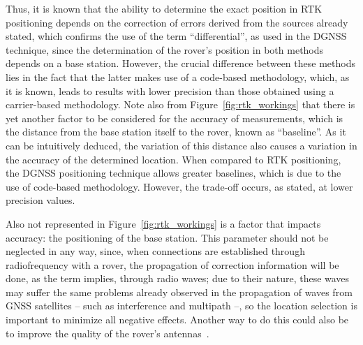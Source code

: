Thus, it is known that the ability to determine the exact position in RTK positioning depends on the correction of errors derived from the sources already stated, which confirms the use of the term ``differential'', as used in the DGNSS technique, since the determination of the rover's position in both methods depends on a base station. However, the crucial difference between these methods lies in the fact that the latter makes use of a code-based methodology, which, as it is known, leads to results with lower precision than those obtained using a carrier-based methodology. Note also from Figure~\ref{fig:rtk_workings} that there is yet another factor to be considered for the accuracy of measurements, which is the distance from the base station itself to the rover, known as ``baseline''.
As it can be intuitively deduced, the variation of this distance also causes a variation in the accuracy of the determined location. When compared to RTK positioning, the DGNSS positioning technique allows greater baselines, which is due to the use of code-based methodology. However, the trade-off occurs, as stated, at lower precision values.

Also not represented in Figure~\ref{fig:rtk_workings} is a factor that impacts accuracy: the positioning of the base station. This parameter should not be neglected in any way, since, when connections are established through radiofrequency with a rover, the propagation of correction information will be done, as the term implies, through radio waves; due to their nature, these waves may suffer the same problems already observed in the propagation of waves from GNSS satellites -- such as interference and multipath --, so the location selection is important to minimize all negative effects. Another way to do this could also be to improve the quality of the rover's antennas~\cite{novatel_gnss,ayers_geosystems_2011,8093778,9292033}.

